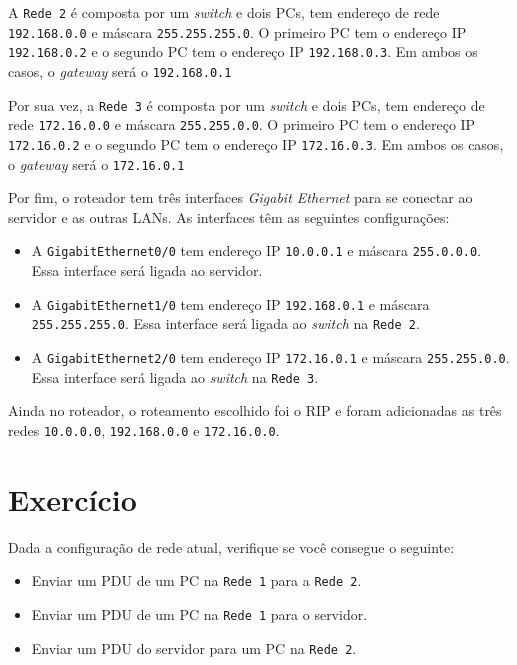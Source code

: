 A \texttt{Rede 2} é composta por um \textit{switch} e dois PCs, tem endereço de rede \texttt{192.168.0.0} e máscara \texttt{255.255.255.0}. O primeiro PC tem o endereço IP \texttt{192.168.0.2} e o segundo PC tem o endereço IP \texttt{192.168.0.3}. Em ambos os casos, o \textit{gateway} será o \texttt{192.168.0.1}

Por sua vez, a \texttt{Rede 3} é composta por um \textit{switch} e dois PCs, tem endereço de rede \texttt{172.16.0.0} e máscara \texttt{255.255.0.0}. O primeiro PC tem o endereço IP \texttt{172.16.0.2} e o segundo PC tem o endereço IP \texttt{172.16.0.3}. Em ambos os casos, o \textit{gateway} será o \texttt{172.16.0.1}

Por fim, o roteador tem três interfaces \textit{Gigabit Ethernet} para se conectar ao servidor e as outras LANs. As interfaces têm as seguintes configurações:

\begin{itemize}
    \item A \texttt{GigabitEthernet0/0} tem endereço IP \texttt{10.0.0.1} e máscara \texttt{255.0.0.0}. Essa interface será ligada ao servidor.
    \item A \texttt{GigabitEthernet1/0} tem endereço IP \texttt{192.168.0.1} e máscara \texttt{255.255.255.0}. Essa interface será ligada ao \textit{switch} na \texttt{Rede 2}.
    \item A \texttt{GigabitEthernet2/0} tem endereço IP \texttt{172.16.0.1} e máscara \texttt{255.255.0.0}. Essa interface será ligada ao \textit{switch} na \texttt{Rede 3}.
\end{itemize}

Ainda no roteador, o roteamento escolhido foi o RIP e foram adicionadas as três redes \texttt{10.0.0.0}, \texttt{192.168.0.0} e \texttt{172.16.0.0}.

\section{Exercício}
Dada a configuração de rede atual, verifique se você consegue o seguinte:
\begin{itemize}
    \item Enviar um PDU de um PC na \texttt{Rede 1} para a \texttt{Rede 2}.
    \item Enviar um PDU de um PC na \texttt{Rede 1} para o servidor.
    \item Enviar um PDU do servidor para um PC na \texttt{Rede 2}.
\end{itemize}

